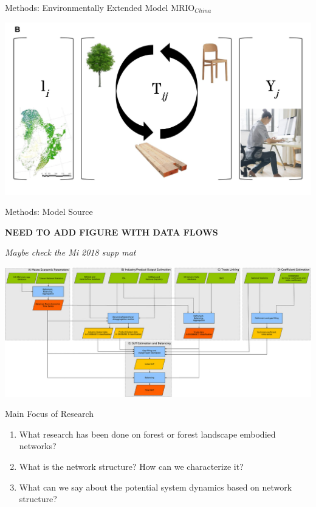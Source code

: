 \documentclass[ignorenonframetext,]{beamer}
\providecommand{\tightlist}{%
  \setlength{\itemsep}{0pt}\setlength{\parskip}{0pt}}
\begin{document}
\begin{frame}{Methods: Environmentally Extended Model MRIO\(_{China}\)}

\begin{center}\includegraphics[width=0.5\linewidth]{images/china_eemrio} \end{center}

\end{frame}

\begin{frame}{Methods: Model Source}

\textbf{NEED TO ADD FIGURE WITH DATA FLOWS}

\emph{Maybe check the Mi 2018 supp mat}

\begin{center}\includegraphics[width=0.5\linewidth]{images/exiobase3} \end{center}

\end{frame}

\begin{frame}{Main Focus of Research}

\begin{enumerate}
\def\labelenumi{\arabic{enumi}.}
\tightlist
\item
  What research has been done on forest or forest landscape embodied
  networks?
\item
  What is the network structure? How can we characterize it?
\item
  What can we say about the potential system dynamics based on network
  structure?
\end{enumerate}

\end{frame}
\end{document}

